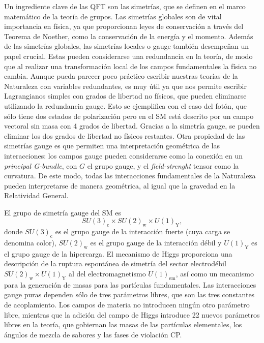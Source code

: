 Un ingrediente clave de las QFT son las simetrías, que se definen en el marco matemático de la teoría de grupos. Las simetrías globales son de vital importancia en física, ya que proporcionan leyes de conservación a través del Teorema de Noether, como la conservación de la energía y el momento. Además de las simetrías globales, las simetrías locales o gauge también desempeñan un papel crucial. Estas pueden considerarse una redundancia en la teoría, de modo que al realizar una transformación local de los campos fundamentales la física no cambia. Aunque pueda parecer poco práctico escribir nuestras teorías de la Naturaleza con variables redundantes, es muy útil ya que nos permite escribir Lagrangianos simples con grados de libertad no físicos, que pueden eliminarse utilizando la redundancia gauge. Esto se ejemplifica con el caso del fotón, que sólo tiene dos estados de polarización pero en el SM está descrito por un campo vectoral sin masa con 4 grados de libertad. Gracias a la simetría gauge, se pueden eliminar los dos grados de libertad no físicos restantes. Otra propiedad de las simetrías gauge es que permiten una interpretación geométrica de las interacciones: los campos gauge pueden considerarse como la conexión en un \textit{principal G-bundle}, con $G$ el grupo gauge, y el \textit{field-strenght} tensor como la curvatura. De este modo, todas las interacciones fundamentales de la Naturaleza pueden interpretarse de manera geométrica, al igual que la gravedad en la Relatividad General.

El grupo de simetría gauge del SM es
\begin{equation*}
SU(3)_{\textrm{c}}\times SU(2)_{\textrm{w}}\times U(1)_{\textrm{Y}},
\end{equation*}
donde $SU(3)_{\textrm{c}}$ es el grupo gauge de la interacción fuerte (cuya carga se denomina color), $SU(2)_{\textrm{w}}$ es el grupo gauge de la interacción débil y $U(1)_{\textrm{Y}}$ es el grupo gauge de la hipercarga. El mecanismo de Higgs proporciona una descripción de la ruptura espontánea de simetría del sector electrodébil $SU(2)_{\textrm{w}}\times U(1)_{\textrm{Y}}$ al del electromagnetismo $U(1)_{\textrm{em}}$, así como un mecanismo para la generación de masas para las partículas fundamentales. Las interacciones gauge puras dependen sólo de tres parámetros libres, que son las tres constantes de acoplamiento. Los campos de materia no introducen ningún otro parámetro libre, mientras que la adición del campo de Higgs introduce 22 nuevos parámetros libres en la teoría, que gobiernan las masas de las partículas elementales, los ángulos de mezcla de sabores y las fases de violación CP.

